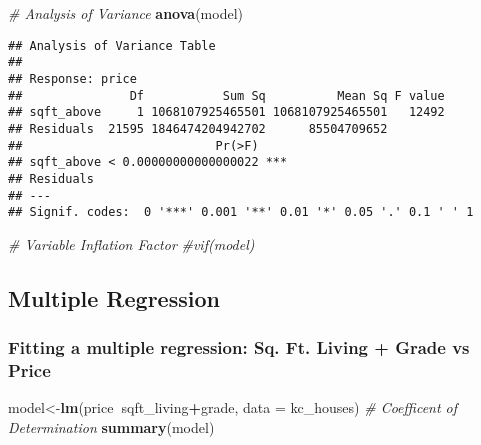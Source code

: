 \documentclass[]{article}
\newenvironment{Shaded}{\begin{snugshade}}{\end{snugshade}}
\newcommand{\CommentTok}[1]{\textcolor[rgb]{0.56,0.35,0.01}{\textit{#1}}}
\newcommand{\DataTypeTok}[1]{\textcolor[rgb]{0.13,0.29,0.53}{#1}}
\newcommand{\KeywordTok}[1]{\textcolor[rgb]{0.13,0.29,0.53}{\textbf{#1}}}
\newcommand{\NormalTok}[1]{#1}
\newcommand{\OperatorTok}[1]{\textcolor[rgb]{0.81,0.36,0.00}{\textbf{#1}}}
\begin{document}
\begin{Shaded}
\begin{Highlighting}[]
\CommentTok{# Analysis of Variance}
\KeywordTok{anova}\NormalTok{(model)}
\end{Highlighting}
\end{Shaded}

\begin{verbatim}
## Analysis of Variance Table
## 
## Response: price
##               Df           Sum Sq          Mean Sq F value
## sqft_above     1 1068107925465501 1068107925465501   12492
## Residuals  21595 1846474204942702      85504709652        
##                           Pr(>F)    
## sqft_above < 0.00000000000000022 ***
## Residuals                           
## ---
## Signif. codes:  0 '***' 0.001 '**' 0.01 '*' 0.05 '.' 0.1 ' ' 1
\end{verbatim}

\begin{Shaded}
\begin{Highlighting}[]
\CommentTok{# Variable Inflation Factor}
\CommentTok{#vif(model)}
\end{Highlighting}
\end{Shaded}

\hypertarget{multiple-regression}{%
\subsection{Multiple Regression}\label{multiple-regression}}

\hypertarget{fitting-a-multiple-regression-sq.-ft.-living-grade-vs-price}{%
\subsubsection{Fitting a multiple regression: Sq. Ft. Living + Grade vs
Price}\label{fitting-a-multiple-regression-sq.-ft.-living-grade-vs-price}}

\begin{Shaded}
\begin{Highlighting}[]
\NormalTok{model<-}\KeywordTok{lm}\NormalTok{(price}\OperatorTok{~}\NormalTok{sqft_living}\OperatorTok{+}\NormalTok{grade, }\DataTypeTok{data =}\NormalTok{ kc_houses)}
\CommentTok{# Coefficent of Determination}
\KeywordTok{summary}\NormalTok{(model)}
\end{Highlighting}
\end{Shaded}
\end{document}
